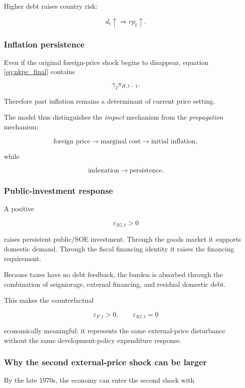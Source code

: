Higher debt raises country risk:

\[
d_t\uparrow
\Rightarrow
rp_t\uparrow.
\]

\subsubsection{Inflation persistence}

Even if the original foreign-price shock begins to disappear, equation
\eqref{eq:nkpc_final} contains

\[
\gamma_I\pi_{H,t-1}.
\]

Therefore past inflation remains a determinant of current price setting.

The model thus distinguishes the \emph{impact} mechanism from the
\emph{propagation} mechanism:

\[
\text{foreign price}
\rightarrow
\text{marginal cost}
\rightarrow
\text{initial inflation},
\]

while

\[
\text{indexation}
\rightarrow
\text{persistence}.
\]

\subsubsection{Public-investment response}

A positive

\[
\varepsilon_{IG,t}>0
\]

raises persistent public/SOE investment. Through the goods market it supports
domestic demand. Through the fiscal financing identity it raises the financing
requirement.

Because taxes have no debt feedback, the burden is absorbed through the
combination of seigniorage, external financing, and residual domestic debt.

This makes the counterfactual

\[
\varepsilon_{F,t}>0,
\qquad
\varepsilon_{IG,t}=0
\]

economically meaningful: it represents the same external-price disturbance
without the same development-policy expenditure response.

\subsubsection{Why the second external-price shock can be larger}

By the late 1970s, the economy can enter the second shock with

